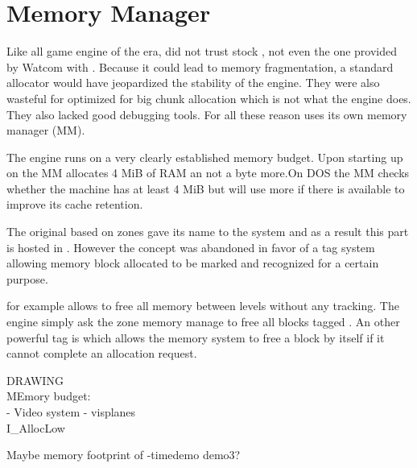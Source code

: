 \section{Memory Manager}
Like all game engine of the era, \doom did not trust stock , not even the one provided by Watcom with . Because it could lead to memory fragmentation, a standard allocator would have jeopardized the stability of the engine. They were also wasteful for optimized for big chunk allocation which is not what the engine does. They also lacked good debugging tools. For all these reason \doom uses its own memory manager (MM).\\
\par

The engine runs on a very clearly established memory budget. Upon starting up on \NeXT the MM allocates 4 MiB of RAM an not a byte more.On DOS the MM checks whether the machine has at least 4 MiB but will use more if there is available to improve its cache retention.\\
\par
The original based on zones gave its name to the system and as a result this part is hosted in . However the concept was abandoned in favor of a tag system allowing memory block allocated to be marked and recognized for a certain purpose.\\
\par
{}
\par
{} for example allows \doom to free all memory between levels without any tracking. The engine simply ask the zone memory manage to free all blocks tagged . An other powerful tag is  which allows the memory system to free a block by itself if it cannot complete an allocation request. \\
\par
  
\par
{}
\par


DRAWING\\
MEmory budget:\\
- Video system
- visplanes\\
I\_AllocLow\\
\par
Maybe memory footprint of -timedemo demo3?\\
\pagebreak
